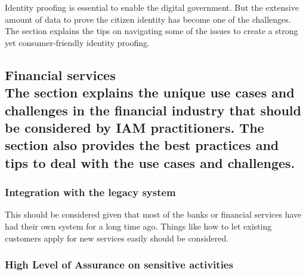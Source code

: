Identity proofing is essential to enable the digital government. But the
extensive amount of data to prove the citizen identity has become one of
the challenges. The section explains the tips on navigating some of the
issues to create a strong yet consumer-friendly identity proofing.

\hypertarget{financial-services-the-section-explains-the-unique-use-cases-and-challenges-in-the-financial-industry-that-should-be-considered-by-iam-practitioners.-the-section-also-provides-the-best-practices-and-tips-to-deal-with-the-use-cases-and-challenges.}{%
\subsection{\texorpdfstring{Financial services\\
The section explains the unique use cases and challenges in the
financial industry that should be considered by IAM practitioners. The
section also provides the best practices and tips to deal with the use
cases and
challenges.}{Financial services The section explains the unique use cases and challenges in the financial industry that should be considered by IAM practitioners. The section also provides the best practices and tips to deal with the use cases and challenges.}}\label{financial-services-the-section-explains-the-unique-use-cases-and-challenges-in-the-financial-industry-that-should-be-considered-by-iam-practitioners.-the-section-also-provides-the-best-practices-and-tips-to-deal-with-the-use-cases-and-challenges.}}

\hypertarget{integration-with-the-legacy-system}{%
\subsubsection{Integration with the legacy
system}\label{integration-with-the-legacy-system}}

This should be considered given that most of the banks or financial
services have had their own system for a long time ago. Things like how
to let existing customers apply for new services easily should be
considered.

\hypertarget{high-level-of-assurance-on-sensitive-activities}{%
\subsubsection{High Level of Assurance on sensitive
activities}\label{high-level-of-assurance-on-sensitive-activities}}

